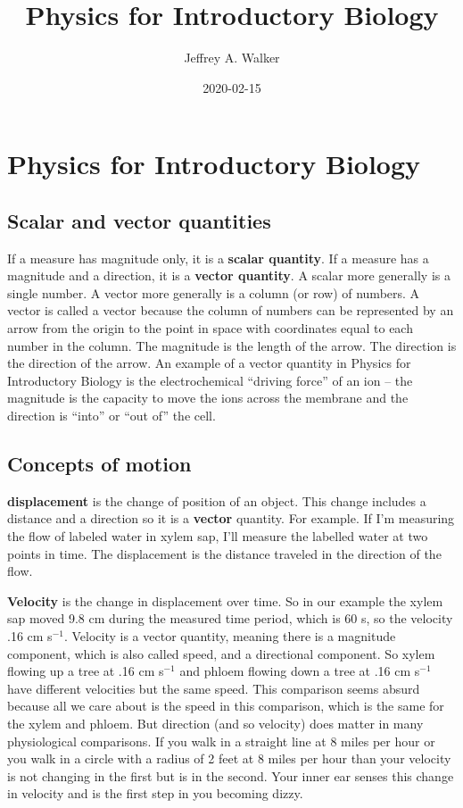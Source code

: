 \documentclass[]{book}
\title{Physics for Introductory Biology}
\author{Jeffrey A. Walker}
\date{2020-02-15}
\begin{document}
\maketitle

{
\setcounter{tocdepth}{1}
\tableofcontents
}
\chapter{Physics for Introductory
Biology}\label{physics-for-introductory-biology}

\section{Scalar and vector
quantities}\label{scalar-and-vector-quantities}

If a measure has magnitude only, it is a \textbf{scalar quantity}. If a
measure has a magnitude and a direction, it is a \textbf{vector
quantity}. A scalar more generally is a single number. A vector more
generally is a column (or row) of numbers. A vector is called a vector
because the column of numbers can be represented by an arrow from the
origin to the point in space with coordinates equal to each number in
the column. The magnitude is the length of the arrow. The direction is
the direction of the arrow. An example of a vector quantity in Physics
for Introductory Biology is the electrochemical ``driving force'' of an
ion -- the magnitude is the capacity to move the ions across the
membrane and the direction is ``into'' or ``out of'' the cell.

\section{Concepts of motion}\label{concepts-of-motion}

\textbf{displacement} is the change of position of an object. This
change includes a distance and a direction so it is a \textbf{vector}
quantity. For example. If I'm measuring the flow of labeled water in
xylem sap, I'll measure the labelled water at two points in time. The
displacement is the distance traveled in the direction of the flow.

\textbf{Velocity} is the change in displacement over time. So in our
example the xylem sap moved 9.8 cm during the measured time period,
which is 60 s, so the velocity .16 cm s\(^{-1}\). Velocity is a vector
quantity, meaning there is a magnitude component, which is also called
speed, and a directional component. So xylem flowing up a tree at .16 cm
s\(^{-1}\) and phloem flowing down a tree at .16 cm s\(^{-1}\) have
different velocities but the same speed. This comparison seems absurd
because all we care about is the speed in this comparison, which is the
same for the xylem and phloem. But direction (and so velocity) does
matter in many physiological comparisons. If you walk in a straight line
at 8 miles per hour or you walk in a circle with a radius of 2 feet at 8
miles per hour than your velocity is not changing in the first but is in
the second. Your inner ear senses this change in velocity and is the
first step in you becoming dizzy.
\end{document}
